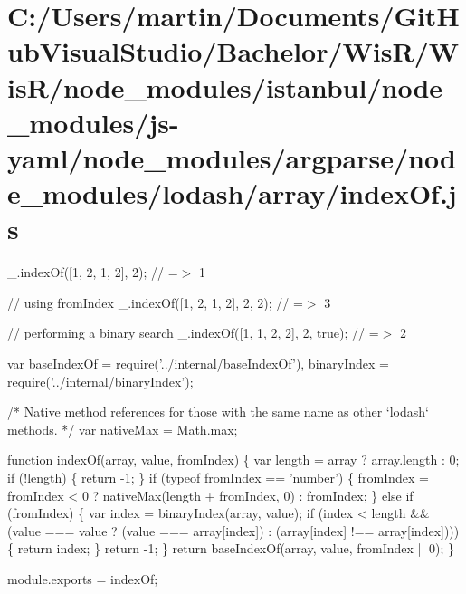 \hypertarget{_c_1_2_users_2martin_2_documents_2_git_hub_visual_studio_2_bachelor_2_wis_r_2_wis_r_2node_module84299fcf888732fa85bd15ea11f7dad9}{}\section{C\+:/\+Users/martin/\+Documents/\+Git\+Hub\+Visual\+Studio/\+Bachelor/\+Wis\+R/\+Wis\+R/node\+\_\+modules/istanbul/node\+\_\+modules/js-\/yaml/node\+\_\+modules/argparse/node\+\_\+modules/lodash/array/index\+Of.\+js}
\+\_\+.\+index\+Of(\mbox{[}1, 2, 1, 2\mbox{]}, 2); // =$>$ 1

// using {\ttfamily from\+Index} \+\_\+.\+index\+Of(\mbox{[}1, 2, 1, 2\mbox{]}, 2, 2); // =$>$ 3

// performing a binary search \+\_\+.\+index\+Of(\mbox{[}1, 1, 2, 2\mbox{]}, 2, true); // =$>$ 2


\begin{DoxyCodeInclude}
var baseIndexOf = require(\textcolor{stringliteral}{'../internal/baseIndexOf'}),
    binaryIndex = require(\textcolor{stringliteral}{'../internal/binaryIndex'});

\textcolor{comment}{/* Native method references for those with the same name as other `lodash` methods. */}
var nativeMax = Math.max;

\textcolor{keyword}{function} indexOf(array, value, fromIndex) \{
  var length = array ? array.length : 0;
  \textcolor{keywordflow}{if} (!length) \{
    \textcolor{keywordflow}{return} -1;
  \}
  \textcolor{keywordflow}{if} (typeof fromIndex == \textcolor{stringliteral}{'number'}) \{
    fromIndex = fromIndex < 0 ? nativeMax(length + fromIndex, 0) : fromIndex;
  \} \textcolor{keywordflow}{else} \textcolor{keywordflow}{if} (fromIndex) \{
    var index = binaryIndex(array, value);
    \textcolor{keywordflow}{if} (index < length &&
        (value === value ? (value === array[index]) : (array[index] !== array[index]))) \{
      \textcolor{keywordflow}{return} index;
    \}
    \textcolor{keywordflow}{return} -1;
  \}
  \textcolor{keywordflow}{return} baseIndexOf(array, value, fromIndex || 0);
\}

module.exports = indexOf;
\end{DoxyCodeInclude}
 